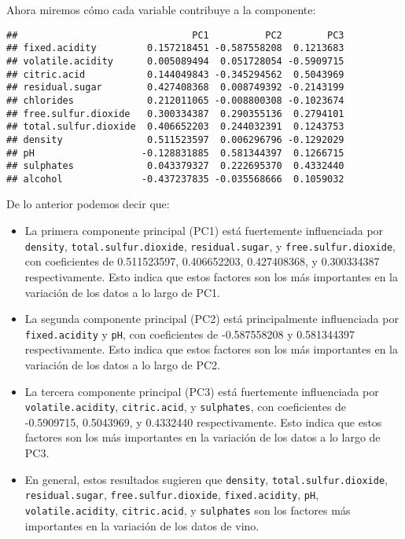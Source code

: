 \documentclass[
]{article}
\newenvironment{Shaded}{\begin{snugshade}}{\end{snugshade}}
\newcommand{\DecValTok}[1]{\textcolor[rgb]{0.00,0.00,0.81}{#1}}
\newcommand{\NormalTok}[1]{#1}
\newcommand{\SpecialCharTok}[1]{\textcolor[rgb]{0.81,0.36,0.00}{\textbf{#1}}}
\begin{document}
Ahora miremos cómo cada variable contribuye a la componente:

\begin{Shaded}
\end{Shaded}

\begin{verbatim}
##                               PC1          PC2        PC3
## fixed.acidity         0.157218451 -0.587558208  0.1213683
## volatile.acidity      0.005089494  0.051728054 -0.5909715
## citric.acid           0.144049843 -0.345294562  0.5043969
## residual.sugar        0.427408368  0.008749392 -0.2143199
## chlorides             0.212011065 -0.008800308 -0.1023674
## free.sulfur.dioxide   0.300334387  0.290355136  0.2794101
## total.sulfur.dioxide  0.406652203  0.244032391  0.1243753
## density               0.511523597  0.006296796 -0.1292029
## pH                   -0.128831885  0.581344397  0.1266715
## sulphates             0.043379327  0.222695370  0.4332440
## alcohol              -0.437237835 -0.035568666  0.1059032
\end{verbatim}

De lo anterior podemos decir que:

\begin{itemize}
\item
  La primera componente principal (PC1) está fuertemente influenciada
  por \texttt{density}, \texttt{total.sulfur.dioxide},
  \texttt{residual.sugar}, y \texttt{free.sulfur.dioxide}, con
  coeficientes de 0.511523597, 0.406652203, 0.427408368, y 0.300334387
  respectivamente. Esto indica que estos factores son los más
  importantes en la variación de los datos a lo largo de PC1.
\item
  La segunda componente principal (PC2) está principalmente influenciada
  por \texttt{fixed.acidity} y \texttt{pH}, con coeficientes de
  -0.587558208 y 0.581344397 respectivamente. Esto indica que estos
  factores son los más importantes en la variación de los datos a lo
  largo de PC2.
\item
  La tercera componente principal (PC3) está fuertemente influenciada
  por \texttt{volatile.acidity}, \texttt{citric.acid}, y
  \texttt{sulphates}, con coeficientes de -0.5909715, 0.5043969, y
  0.4332440 respectivamente. Esto indica que estos factores son los más
  importantes en la variación de los datos a lo largo de PC3.
\item
  En general, estos resultados sugieren que \texttt{density},
  \texttt{total.sulfur.dioxide}, \texttt{residual.sugar},
  \texttt{free.sulfur.dioxide}, \texttt{fixed.acidity}, \texttt{pH},
  \texttt{volatile.acidity}, \texttt{citric.acid}, y \texttt{sulphates}
  son los factores más importantes en la variación de los datos de vino.
\end{itemize}
\end{document}

